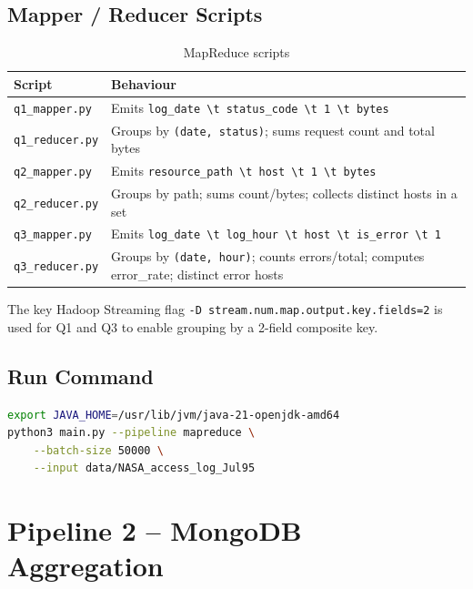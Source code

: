 \documentclass[12pt,a4paper]{article}
\begin{document}
\subsection{Mapper / Reducer Scripts}

\begin{table}[h!]
\centering
\begin{tabularx}{\textwidth}{lX}
\toprule
Script & Behaviour \\
\midrule
\texttt{q1\_mapper.py}  & Emits \texttt{log\_date \textbackslash t status\_code \textbackslash t 1 \textbackslash t bytes} \\
\texttt{q1\_reducer.py} & Groups by \texttt{(date, status)}; sums request count and total bytes \\
\texttt{q2\_mapper.py}  & Emits \texttt{resource\_path \textbackslash t host \textbackslash t 1 \textbackslash t bytes} \\
\texttt{q2\_reducer.py} & Groups by path; sums count/bytes; collects distinct hosts in a set \\
\texttt{q3\_mapper.py}  & Emits \texttt{log\_date \textbackslash t log\_hour \textbackslash t host \textbackslash t is\_error \textbackslash t 1} \\
\texttt{q3\_reducer.py} & Groups by \texttt{(date, hour)}; counts errors/total; computes error\_rate; distinct error hosts \\
\bottomrule
\end{tabularx}
\caption{MapReduce scripts}
\end{table}

The key Hadoop Streaming flag \texttt{-D stream.num.map.output.key.fields=2} is used for Q1
and Q3 to enable grouping by a 2-field composite key.

\subsection{Run Command}

\begin{lstlisting}[language=bash]
export JAVA_HOME=/usr/lib/jvm/java-21-openjdk-amd64
python3 main.py --pipeline mapreduce \
    --batch-size 50000 \
    --input data/NASA_access_log_Jul95
\end{lstlisting}

\section{Pipeline 2 -- MongoDB Aggregation}
\end{document}

